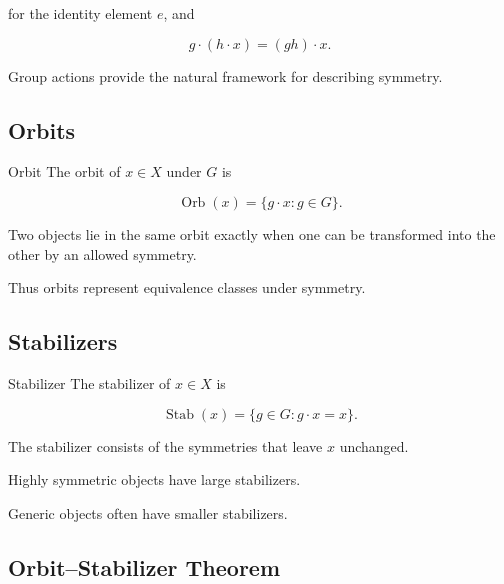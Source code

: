 for the identity element \(e\), and

\[
\boxed{
g\cdot(h\cdot x)
=
(gh)\cdot x.
}
\]

Group actions provide the natural framework for describing symmetry.

\subsection{Orbits}
\label{subsec:orbits-algebraic-combinatorics}

\begin{definitionbox}{Orbit}
The orbit of \(x\in X\) under \(G\) is

\[
\boxed{
\operatorname{Orb}(x)
=
\{g\cdot x:g\in G\}.
}
\]
\end{definitionbox}

Two objects lie in the same orbit exactly when one can be transformed
into the other by an allowed symmetry.

Thus orbits represent equivalence classes under symmetry.

\subsection{Stabilizers}
\label{subsec:stabilizers-algebraic-combinatorics}

\begin{definitionbox}{Stabilizer}
The stabilizer of \(x\in X\) is

\[
\boxed{
\operatorname{Stab}(x)
=
\{g\in G:g\cdot x=x\}.
}
\]
\end{definitionbox}

The stabilizer consists of the symmetries that leave \(x\) unchanged.

Highly symmetric objects have large stabilizers.

Generic objects often have smaller stabilizers.

\subsection{Orbit--Stabilizer Theorem}
\label{subsec:orbit-stabilizer}

